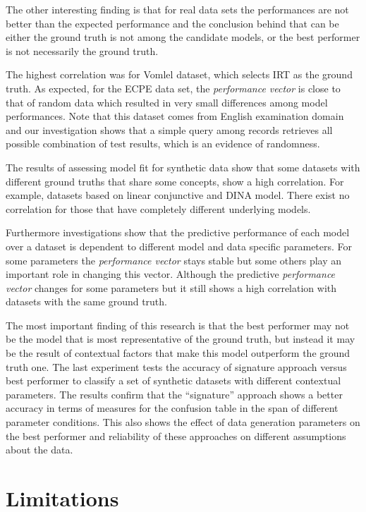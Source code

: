 The other interesting finding is that for real data sets the performances are not better than the expected performance and the conclusion behind that can be either the ground truth is not among the candidate models, or the best performer is not necessarily the ground truth. 



The highest correlation was for Vomlel dataset, which selects IRT as the ground truth. As expected, for the ECPE data set, the \textit{performance vector} is close to that of random data which resulted in very small differences among model performances. Note that this dataset comes from English examination domain and our investigation shows that a simple query among records retrieves all possible combination of test results, which is an evidence of randomness.

The results of assessing model fit for synthetic data show that some datasets with different ground truths that share some concepts, show a high correlation. For example, datasets based on linear conjunctive and DINA model. There exist no correlation for those that have completely different underlying models.

Furthermore investigations show that the predictive performance of each model over a dataset is dependent to different model and data specific parameters. For some parameters the \textit{performance vector} stays stable but some others play an important role in changing this vector. Although the predictive \textit{performance vector} changes for some parameters but it still shows a high correlation with datasets with the same ground truth.


The most important finding of this research is that the best performer may not be the model that is most representative of the ground truth, but instead it may be the result of contextual factors that make this model outperform the ground truth one. The last experiment tests the accuracy of signature approach versus best performer to classify a set of synthetic datasets with different contextual parameters. The results confirm that the ``signature'' approach shows a better accuracy in terms of measures for the confusion table in the span of different parameter conditions. This also shows the effect of data generation parameters on the best performer and reliability of these approaches on different assumptions about the data.

\section{Limitations}

